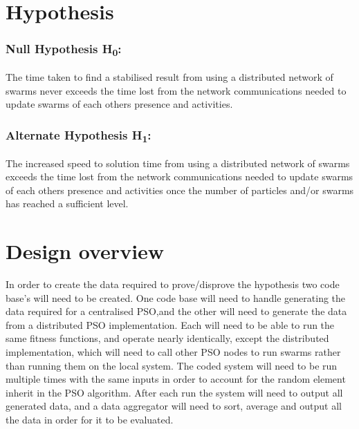 \documentclass[oneside,12pt]{book}
\begin{document}
\section{Hypothesis}
\subsubsection{Null Hypothesis H\textsubscript{0}:}
The time taken to find a stabilised result from using a distributed network of swarms never exceeds the time lost from the network communications needed to update swarms of each others presence and activities.

\subsubsection{Alternate Hypothesis H\textsubscript{1}:}
The increased speed to solution time from using a distributed network of swarms exceeds the time lost from the network communications needed to update swarms of each others presence and activities once the number of particles and/or swarms has reached a sufficient level.

\section{Design overview}
In order to create the data required to prove/disprove the hypothesis two code base's will need to be created. One code base will need to handle generating the data required for a centralised PSO,and the other will need to generate the data from a distributed PSO implementation. Each will need to be able to run the same fitness functions, and operate nearly identically, except the distributed implementation, which will need to call other PSO nodes to run swarms rather than running them on the local system. 
The coded system will need to be run multiple times with the same inputs in order to account for the random element inherit in the PSO algorithm. After each run the system will need to output all generated data, and a data aggregator will need to sort, average and output all the data in order for it to be evaluated.
\end{document}
